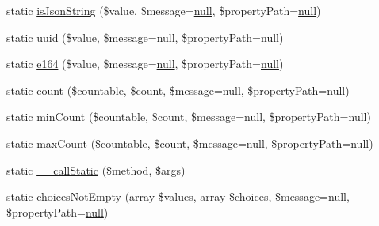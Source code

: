 \begin{DoxyCompactItemize}
\item 
static \mbox{\hyperlink{class_assert_1_1_assertion_aa30cf0a84536d86cd7dec4b819094b00}{is\+Json\+String}} (\$value, \$message=\mbox{\hyperlink{class_assert_1_1_assertion_af95d8b1582dd619cc0159041bc6892c5}{null}}, \$property\+Path=\mbox{\hyperlink{class_assert_1_1_assertion_af95d8b1582dd619cc0159041bc6892c5}{null}})
\item 
static \mbox{\hyperlink{class_assert_1_1_assertion_aa555eba6dc1448a63b101c6043046f47}{uuid}} (\$value, \$message=\mbox{\hyperlink{class_assert_1_1_assertion_af95d8b1582dd619cc0159041bc6892c5}{null}}, \$property\+Path=\mbox{\hyperlink{class_assert_1_1_assertion_af95d8b1582dd619cc0159041bc6892c5}{null}})
\item 
static \mbox{\hyperlink{class_assert_1_1_assertion_a43852d9f74eb02963c34354031360e20}{e164}} (\$value, \$message=\mbox{\hyperlink{class_assert_1_1_assertion_af95d8b1582dd619cc0159041bc6892c5}{null}}, \$property\+Path=\mbox{\hyperlink{class_assert_1_1_assertion_af95d8b1582dd619cc0159041bc6892c5}{null}})
\item 
static \mbox{\hyperlink{class_assert_1_1_assertion_a4754522becb4ec84cc7b9ead4e2832ca}{count}} (\$countable, \$count, \$message=\mbox{\hyperlink{class_assert_1_1_assertion_af95d8b1582dd619cc0159041bc6892c5}{null}}, \$property\+Path=\mbox{\hyperlink{class_assert_1_1_assertion_af95d8b1582dd619cc0159041bc6892c5}{null}})
\item 
static \mbox{\hyperlink{class_assert_1_1_assertion_a55ec6f0832f6fb9373f250d2ceb02b9a}{min\+Count}} (\$countable, \$\mbox{\hyperlink{class_assert_1_1_assertion_a4754522becb4ec84cc7b9ead4e2832ca}{count}}, \$message=\mbox{\hyperlink{class_assert_1_1_assertion_af95d8b1582dd619cc0159041bc6892c5}{null}}, \$property\+Path=\mbox{\hyperlink{class_assert_1_1_assertion_af95d8b1582dd619cc0159041bc6892c5}{null}})
\item 
static \mbox{\hyperlink{class_assert_1_1_assertion_a25716f3f42d9def5833a42a49a1a7695}{max\+Count}} (\$countable, \$\mbox{\hyperlink{class_assert_1_1_assertion_a4754522becb4ec84cc7b9ead4e2832ca}{count}}, \$message=\mbox{\hyperlink{class_assert_1_1_assertion_af95d8b1582dd619cc0159041bc6892c5}{null}}, \$property\+Path=\mbox{\hyperlink{class_assert_1_1_assertion_af95d8b1582dd619cc0159041bc6892c5}{null}})
\item 
static \mbox{\hyperlink{class_assert_1_1_assertion_a89a3cf7d74392ec535e8503e89ead563}{\+\_\+\+\_\+call\+Static}} (\$method, \$args)
\item 
static \mbox{\hyperlink{class_assert_1_1_assertion_ab4a71b366e73727f68da3a2f84c14187}{choices\+Not\+Empty}} (array \$values, array \$choices, \$message=\mbox{\hyperlink{class_assert_1_1_assertion_af95d8b1582dd619cc0159041bc6892c5}{null}}, \$property\+Path=\mbox{\hyperlink{class_assert_1_1_assertion_af95d8b1582dd619cc0159041bc6892c5}{null}})

\end{DoxyCompactItemize}
